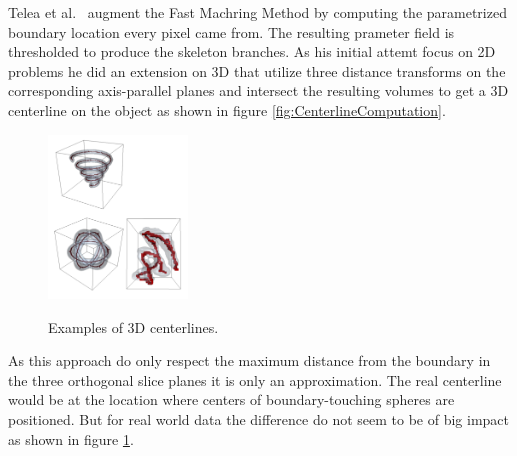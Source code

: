 Telea et al.~\cite{alexandru2002augmented} augment the Fast Machring Method by computing the parametrized boundary location every pixel came from. The resulting prameter field is thresholded to produce the skeleton branches.
As his initial attemt focus on 2D problems he did an extension on 3D that utilize three distance transforms on the corresponding axis-parallel planes and intersect the resulting volumes to get a 3D centerline on the object as shown in figure \ref{fig:CenterlineComputation}.

\begin{figure}[h]
	\centering
	\includegraphics[width=0.33\textwidth]{./Images/ExampleCenterlines_II.png} \\
	\caption{Examples of 3D centerlines.}
	\cite{alexandru2002augmented}
	\label{fig:ExampleCenterlines_II}
\end{figure} 

As this approach do only respect the maximum distance from the boundary in the three orthogonal slice planes it is only an approximation. The real centerline would be at the location where centers of boundary-touching spheres are positioned. But for real world data the difference do not seem to be of big impact as shown in figure \ref{fig:ExampleCenterlines_II}. 

